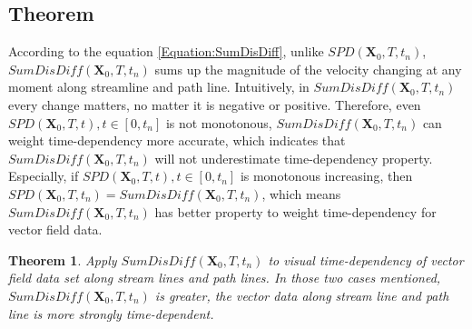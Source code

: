 \documentclass[
     11pt,         %
     a4paper,      %
     oneside,
     ]{article}
\newtheorem{mytheory}{Theorem}
\newcommand{\vect}[1]{\boldsymbol{#1}}
\begin{document}
\subsection{Theorem}
According to the equation \ref{Equation:SumDisDiff}, unlike $SPD(\vect{X}_{0},T,t_{n})$, $SumDisDiff(\vect{X}_{0},T,t_{n})$ sums up the magnitude of the velocity changing at any moment along streamline and path line. Intuitively, in $SumDisDiff(\vect{X}_{0},T,t_{n})$ every change matters, no matter it is negative or positive. Therefore, even $SPD(\vect{X}_{0},T,t), t\in[0,t_{n}]$ is not monotonous, $SumDisDiff(\vect{X}_{0},T,t_{n})$ can weight time-dependency more accurate, which indicates that $SumDisDiff(\vect{X}_{0},T,t_{n})$ will not underestimate time-dependency property.\\
Especially, if $SPD(\vect{X}_{0},T,t), t\in[0,t_{n}]$ is monotonous increasing, then $SPD(\vect{X}_{0},T,t_{n})=SumDisDiff(\vect{X}_{0},T,t_{n})$, which means $SumDisDiff(\vect{X}_{0},T,t_{n})$ has better property to weight time-dependency for vector field data.
\begin{mytheory}
	Apply $SumDisDiff(\vect{X}_{0},T,t_{n})$ to visual time-dependency of vector field data set along stream lines and path lines. In those two cases mentioned, $SumDisDiff(\vect{X}_{0},T,t_{n})$ is greater, the vector data along stream line and path line is more strongly time-dependent. 
\end{mytheory}
\end{document}
